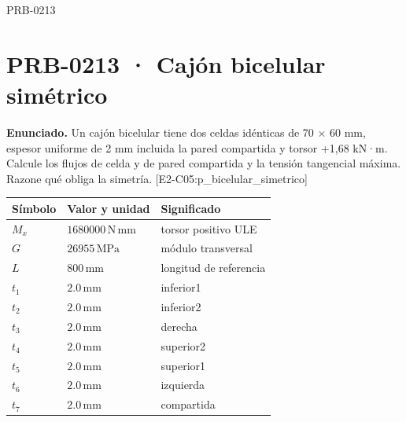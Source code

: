 \begin{studiumworked}{PRB-0213}

\section{PRB-0213 · Cajón bicelular simétrico}

\textbf{Enunciado.} Un cajón bicelular tiene dos celdas idénticas de 70 \ensuremath{\times} 60 mm, espesor uniforme de 2 mm incluida la pared compartida y torsor +1,68 kN·m. Calcule los flujos de celda y de pared compartida y la tensión tangencial máxima. Razone qué obliga la simetría. [E2-C05:p\_bicelular\_simetrico]

\par\medskip\noindent\begin{tabular}{@{}p{.18\linewidth}p{.26\linewidth}p{.48\linewidth}@{}}
\toprule Símbolo & Valor y unidad & Significado\\\midrule
$M_{x}$ & $1680000\,\mathrm{N\,mm}$ & torsor positivo ULE\\
$G$ & $26955\,\mathrm{MPa}$ & módulo transversal\\
$L$ & $800\,\mathrm{mm}$ & longitud de referencia\\
$t_{1}$ & $2.0\,\mathrm{mm}$ & inferior1\\
$t_{2}$ & $2.0\,\mathrm{mm}$ & inferior2\\
$t_{3}$ & $2.0\,\mathrm{mm}$ & derecha\\
$t_{4}$ & $2.0\,\mathrm{mm}$ & superior2\\
$t_{5}$ & $2.0\,\mathrm{mm}$ & superior1\\
$t_{6}$ & $2.0\,\mathrm{mm}$ & izquierda\\
$t_{7}$ & $2.0\,\mathrm{mm}$ & compartida\\
\bottomrule\end{tabular}\par\medskip


\end{studiumworked}
